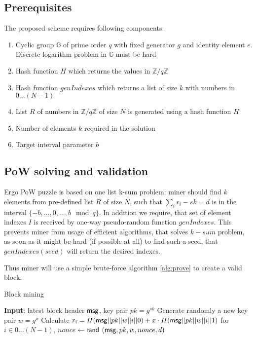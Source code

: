 \documentclass[]{article}
\begin{document}
    \subsection{Prerequisites}
    The proposed scheme requires following components:
    \begin{enumerate}
        \item Cyclic group $\mathbb{G}$ of prime order $q$ with fixed generator $g$
        and identity element $e$. Discrete logarithm problem in $\mathbb{G}$ must be hard
        \item Hash function $H$ which returns the values in $\mathbb{Z}/q\mathbb{Z}$
        \item Hash function $genIndexes$ which returns a list of size $k$
        with numbers in $0\dots (N-1)$
        \item List $R$ of numbers in $\mathbb{Z}/q\mathbb{Z}$ of size $N$ is generated
        using a hash function $H$
        \item Number of elements $k$ required in the solution
        \item Target interval parameter $b$
    \end{enumerate}

    \subsection{PoW solving and validation}

    Ergo PoW puzzle is based on one list k-sum problem: miner should find
    $k$ elements from pre-defined list $R$ of size $N$, such that
    $\sum_{i} r_{i} - sk = d$ is in the interval $\{-b,\dots,0,\dots,b\mod q\}$.
    In addition we require, that set of element indexes $I$ is received
    by one-way pseudo-random function $genIndexes$. This prevents miner
    from usage of efficient algorithms, that solves $k-sum$ problem, as
    soon as it might be hard (if possible at all) to find such a seed,
    that $genIndexes(seed)$ will return the desired indexes.

    Thus miner will use a simple brute-force algorithm \ref{alg:prove} to
    create a valid block.

    \begin{algorithm}[H]
        \caption{Block mining}
        \label{alg:prove}
        \begin{algorithmic}[1]
            \State \textbf{Input}: latest block header $\mathsf{msg}$, key pair $pk=g^{sk}$
            \State Generate randomly a new key pair $w=g^x$
            \State Calculate $r_i=H(\mathsf{msg}||pk||w||i||0)+x\cdot H(\mathsf{msg}||pk||w||i||1)$ for $i\in 0\dots (N-1)$,
                \State $nonce\leftarrow\mathsf{rand}$
                \State \Return $(\mathsf{msg},pk,w,nonce,d)$
                \EndIf
            \EndWhile
        \end{algorithmic}
    \end{algorithm}
\end{document}
